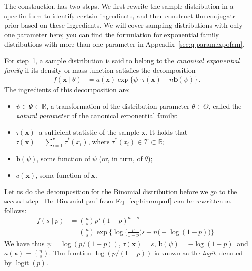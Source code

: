 \documentclass[12pt,a4paper	,twoside]{article}
\newcommand{\reals}{\mathbb{R}}
\newcommand{\mbf}[1]{\mathbf{#1}}
\newcommand{\bs}[1]{\boldsymbol{#1}}
\renewcommand{\vec}[1]{{\bs#1}}
\newcommand{\logit}{\operatorname{logit}} %
\begin{document}
The construction has two steps.
We first rewrite the sample distribution in a specific form to identify certain ingredients,
and then construct the conjugate prior based on these ingredients.
We will cover sampling distributions with only one parameter here;
you can find the formulation for exponential family distributions with more than one parameter in Appendix~\ref{sec:q-paramexpofam}.

For step~1, a sample distribution is said to belong to the \emph{canonical exponential family}
if its density or mass function satisfies the decomposition
\begin{align}
f(\vec{x} \mid \theta) &= a(\vec{x})\exp\big\{ \psi \cdot \tau(\vec{x}) - n \mbf{b}(\psi)\big\}\,.
\label{eq:expofam-sampledens}
\end{align}
The ingredients of this decomposition are:
\begin{itemize}
\item $\psi \in \Psi \subset \reals$, a transformation of the distribution parameter $\theta \in \Theta$,
called the \emph{natural parameter} of the canonical exponential family;
\item $\tau(\vec{x})$, a sufficient statistic of the sample $\vec{x}$.
It holds that $\tau(\vec{x}) = \sum_{i=1}^n \tau^*(x_i)$,
where $\tau^*(x_i) \in \mathcal{T} \subset \reals$;
\item $\mbf{b}(\psi)$, some function of $\psi$ (or, in turn, of $\theta$);
\item $a(\vec{x})$, some function of $\vec{x}$.
\end{itemize}
Let us do the decomposition for the Binomial distribution before we go to the second step.
The Binomial pmf from Eq.~\eqref{eq:binompmf} can be rewritten as follows:
\begin{align}
f(s\mid p)
 &= {n \choose s} p^s (1-p)^{n-s} \\
 &= {n \choose s} \exp\Big\{ \log\Big(\frac{p}{1-p}\Big) s - n \big(-\log(1-p)\big) \Big\} \,.
\end{align}
We have thus $\psi = \log(p/(1-p))$, $\tau(\vec{x}) = s$, $\mbf{b}(\psi) = -\log(1-p)$, and $a(\vec{x}) = {n \choose s}$.
The function $\log(p/(1-p))$ is known as the \emph{logit}, denoted by $\logit(p)$.
\end{document}
